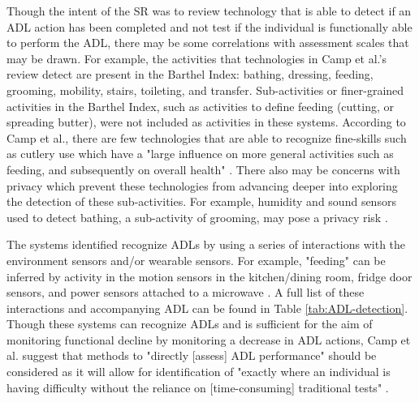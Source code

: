 Though the intent of the SR was to review technology that is able to detect if an ADL action has been completed and not test if the individual is functionally able to perform the ADL, there may be some correlations with assessment scales that may be drawn. For example, the activities that technologies in Camp et al.'s review detect are present in the Barthel Index: bathing, dressing, feeding, grooming, mobility, stairs, toileting, and transfer. Sub-activities or finer-grained activities in the Barthel Index, such as activities to define feeding (cutting, or spreading butter), were not included as activities in these systems. According to Camp et al., there are few technologies that are able to recognize fine-skills such as cutlery use which have a "large influence on more general activities such as feeding, and subsequently on overall health" \cite{camp_technology_2021}. There also may be concerns with privacy which prevent these technologies from advancing deeper into exploring the detection of these sub-activities. For example, humidity and sound sensors used to detect bathing, a sub-activity of grooming, may pose a privacy risk \cite{camp_technology_2021}.

The systems identified recognize ADLs by using a series of interactions with the environment sensors and/or wearable sensors. For example, "feeding" can be inferred by activity in the motion sensors in the kitchen/dining room, fridge door sensors, and power sensors attached to a microwave \cite{camp_technology_2021}. A full list of these interactions and accompanying ADL can be found in Table \ref{tab:ADL-detection}. Though these systems can recognize ADLs and is sufficient for the aim of monitoring functional decline by monitoring a decrease in ADL actions, Camp et al. suggest that methods to "directly [assess] ADL performance" should be considered as it will allow for identification of "exactly where an individual is having difficulty without the reliance on [time-consuming] traditional tests" \cite{camp_technology_2021}. 

